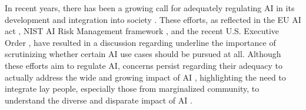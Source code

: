 
In recent years, there has been a growing call for adequately regulating AI in its development and integration into society \citep{pistilli2023stronger}. These efforts, as reflected in the EU AI act \citep{AIAct_2023}, NIST AI Risk Management framework \citep{NIST_2021}, and the recent U.S. Executive Order \citep{executiveorder2023}, have resulted in a discussion regarding underline the importance of scrutinizing whether certain AI use cases should be pursued at all. Although these efforts aim to regulate AI, concerns persist regarding their adequacy to actually address the wide and growing impact of AI \citep{dominguez2024mapping}, highlighting the need to integrate lay people, especially those from marginalized community, to understand the diverse and disparate impact of AI \citep{}. 

